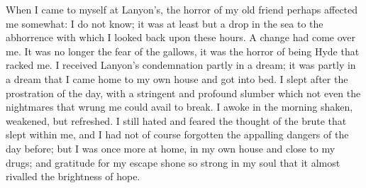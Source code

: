 \documentclass[]{novel}
\begin{document}
When I came to myself at Lanyon's, the horror of my old friend perhaps affected me somewhat: I do not know; it was at least but a drop in the sea to the abhorrence with which I looked back upon these hours. A change had come over me. It was no longer the fear of the gallows, it was the horror of being Hyde that racked me. I received Lanyon's condemnation partly in a dream; it was partly in a dream that I came home to my own house and got into bed. I slept after the prostration of the day, with a stringent and profound slumber which not even the nightmares that wrung me could avail to break. I awoke in the morning shaken, weakened, but refreshed. I still hated and feared the thought of the brute that slept within me, and I had not of course forgotten the appalling dangers of the day before; but I was once more at home, in my own house and close to my drugs; and gratitude for my escape shone so strong in my soul that it almost rivalled the brightness of hope.
\end{document}
